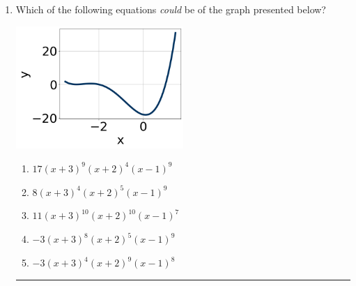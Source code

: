 \documentclass[14pt]{extbook}
\newcommand{\litem}[1]{\item#1\hspace*{-1cm}\rule{\textwidth}{0.4pt}}
\begin{document}
\begin{enumerate}
{\begin{enumerate}[label=\Alph*.]
\end{enumerate} }
\litem{
Which of the following equations \textit{could} be of the graph presented below?
\begin{center}
    \includegraphics[width=0.5\textwidth]{../Figures/polyGraphToFunctionCopyC.png}
\end{center}
\begin{enumerate}[label=\Alph*.]
\item \( 17(x + 3)^{9} (x + 2)^{4} (x - 1)^{9} \)
\item \( 8(x + 3)^{4} (x + 2)^{5} (x - 1)^{9} \)
\item \( 11(x + 3)^{10} (x + 2)^{10} (x - 1)^{7} \)
\item \( -3(x + 3)^{8} (x + 2)^{5} (x - 1)^{9} \)
\item \( -3(x + 3)^{4} (x + 2)^{9} (x - 1)^{8} \)


\end{enumerate}}
\end{enumerate}
\end{document}
